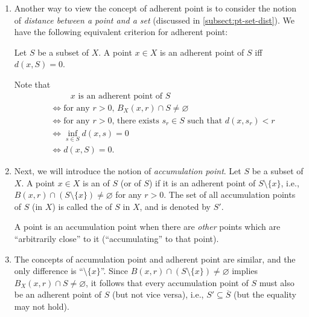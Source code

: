 \begin{enumerate}
\item Another way to view the concept of adherent point is to consider the
notion of \emph{distance between a point and a set} (discussed in
\cref{subsect:pt-set-dist}). We have the following equivalent criterion for
adherent point:
\begin{proposition}
\label{prp:adherent-zero-dist-from-set}
Let \(S\) be a subset of \(X\). A point \(x\in X\) is an adherent point of
\(S\) iff \(d(x,S)=0\).
\end{proposition}
\begin{pf}
Note that
\begin{align*}
&\hspace{1cm}\text{\(x\) is an adherent point of \(S\)}\\
&\iff \text{for any \(r>0\), \(B_X(x,r)\cap S\ne\varnothing\)}\\
&\iff\text{for any \(r>0\), there exists \(s_r\in S\) such that \(d(x,s_r)<r\)}\\
&\iff \inf_{s\in S}d(x,s)=0\\
&\iff d(x,S)=0.
\end{align*}
\end{pf}

\item Next, we will introduce the notion of \emph{accumulation point}. Let
\(S\) be a subset of \(X\). A point \(x\in X\) is an 
of \(S\) (or  of \(S\)) if it is an adherent point of
\(S\setminus\{x\}\), i.e., \(B(x,r)\cap(S\setminus\{x\})\ne\varnothing\) for
any \(r>0\). The set of all accumulation points of \(S\) (in \(X\)) is called
the  of \(S\) in \(X\), and is denoted by \(S'\).


\begin{intuition}
A point is an accumulation point when there are \emph{other} points which are
``arbitrarily close'' to it (``accumulating'' to that point).
\begin{center}
\end{center}
\end{intuition}


\item The concepts of accumulation point and adherent point are similar, and
the only difference is ``\(\setminus\{x\}\)''. Since
\(B(x,r)\cap(S\setminus\{x\})\ne\varnothing\) implies \(B_X(x,r)\cap
S\ne\varnothing\), it follows that every accumulation point of \(S\) must also
be an adherent point of \(S\) (but not vice versa), i.e., \(S'\subseteq
\overline{S}\) (but the equality may not hold).


\end{enumerate}
